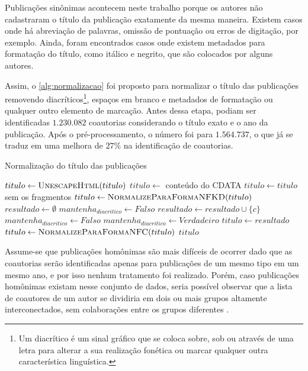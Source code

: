 Publicações sinônimas acontecem neste trabalho porque os autores não cadastraram o título da publicação exatamente da mesma maneira. Existem casos onde há abreviação de palavras, omissão de pontuação ou erros de digitação, por exemplo. Ainda, foram encontrados casos onde existem metadados para formatação do título, como itálico e negrito, que são colocados por alguns autores.

Assim, o \autoref{alg:normalizacao} foi proposto para normalizar o título das publicações removendo diacríticos\footnote{Um diacrítico é um sinal gráfico que se coloca sobre, sob ou através de uma letra para alterar a sua realização fonética ou marcar qualquer outra característica linguística.}, espaços em branco e metadados de formatação ou qualquer outro elemento de marcação. Antes dessa etapa, podiam ser identificadas $1.230.082$ coautorias considerando o título exato e o ano da publicação. Após o pré-processamento, o número foi para $1.564.737$, o que já se traduz em uma melhora de $27$\% na identificação de coautorias.

\begin{algorithm}
  \caption{Normalização do título das publicações}
  \label{alg:normalizacao}
  \begin{algorithmic}[1]
    \State $titulo\gets \Call{UnescapeHtml}{titulo}$ 
        \State $titulo\gets$ conteúdo do CDATA
    \EndIf
        \State $titulo\gets titulo$ sem os fragmentos  
    \EndIf
    \State $titulo\gets \Call{NormalizeParaFormaNFKD}{titulo}$
    \State $resultado\gets \emptyset$
    \State $mantenha_{diacritico}\gets Falso$
            \State $resultado \gets resultado \cup \{c\}$
                \State $mantenha_{diacritico}\gets Falso$
            \Else
                \State $mantenha_{diacritico}\gets Verdadeiro$
            \EndIf
        \EndIf
    \EndFor
    \State $titulo\gets resultado$
    \State $titulo\gets \Call{NormalizeParaFormaNFC}{titulo}$
    \State \Return $titulo$
  \EndProcedure
  \end{algorithmic}
\end{algorithm}

Assume-se que publicações homônimas são mais difíceis de ocorrer dado que as coautorias serão identificadas apenas para publicações de um mesmo tipo em um mesmo ano, e por isso nenhum tratamento foi realizado. Porém, caso publicações homônimas existam nesse conjunto de dados, seria possível observar que a lista de coautores de um autor se dividiria em dois ou mais grupos altamente interconectados, sem colaborações entre os grupos diferentes \cite{franceschet2011collaboration}.

